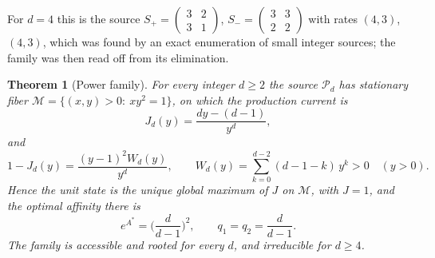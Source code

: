 \documentclass[11pt,reqno]{amsart}
\theoremstyle{plain}
\newtheorem{theorem}{Theorem}[section]
\theoremstyle{definition}
\theoremstyle{remark}
\numberwithin{equation}{section}
\newcommand{\Sp}{S_{+}}
\newcommand{\Sm}{S_{-}}
\begin{document}
For $d=4$ this is the source $\Sp=\begin{pmatrix}3&2\\3&1\end{pmatrix}$, $\Sm=\begin{pmatrix}3&3\\2&2\end{pmatrix}$ with rates $(4,3)$, $(4,3)$, which was found by an exact enumeration of small integer sources; the family was then read off from its elimination.

\begin{theorem}[Power family]\label{thm:power}
For every integer $d\ge2$ the source $\mathcal P_d$ has stationary fiber $\mathcal M=\{(x,y)>0:\ xy^2=1\}$, on which the production current is
\begin{equation}\label{eq:powercurrent}
J_d(y)=\frac{dy-(d-1)}{y^d},
\end{equation}
and
\begin{equation}\label{eq:powergap}
1-J_d(y)=\frac{(y-1)^2W_d(y)}{y^d},\qquad W_d(y)=\sum_{k=0}^{d-2}(d-1-k)\,y^k>0\quad(y>0).
\end{equation}
Hence the unit state is the unique global maximum of $J$ on $\mathcal M$, with $J=1$, and the optimal affinity there is
\[
e^{A^*}=\Big(\frac d{d-1}\Big)^2,\qquad q_1=q_2=\frac d{d-1}.
\]
The family is accessible and rooted for every $d$, and irreducible for $d\ge4$.
\end{theorem}
\end{document}
